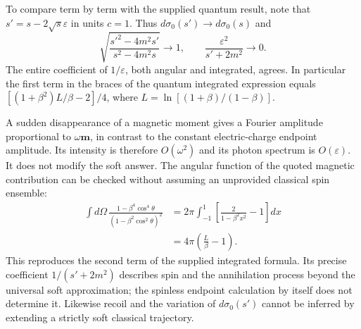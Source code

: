 To compare term by term with the supplied quantum result, note that
$s'=s-2\sqrt{s}\varepsilon$ in units $c=1$.  Thus
$d\sigma_0(s')\to d\sigma_0(s)$ and
\[
\sqrt{\frac{s'^2-4m^2s'}{s^2-4m^2s}}\longrightarrow1,
\qquad \frac{\varepsilon^2}{s'+2m^2}\longrightarrow0.
\]
The entire coefficient of $1/\varepsilon$, both angular and
integrated, agrees.  In particular the first term in the braces of
the quantum integrated expression equals
$[(1+\beta^2)L/\beta-2]/4$, where
$L=\ln[(1+\beta)/(1-\beta)]$.

A sudden disappearance of a magnetic moment gives a Fourier
amplitude proportional to $\omega\mathbf m$, in contrast to the
constant electric-charge endpoint amplitude.  Its intensity is
therefore $O(\omega^2)$ and its photon spectrum is $O(\varepsilon)$.
It does not modify the soft answer.  The angular function of the
quoted magnetic contribution can be checked without assuming an
unprovided classical spin ensemble:
\begin{align*}
\int d\Omega\,\frac{1-\beta^4\cos^4\theta}
 {(1-\beta^2\cos^2\theta)^2}
&=2\pi\int_{-1}^{1}\left[\frac2{1-\beta^2x^2}-1\right]dx\\
&=4\pi\left(\frac L\beta-1\right).
\end{align*}
This reproduces the second term of the supplied integrated formula.
Its precise coefficient $1/(s'+2m^2)$ describes spin and the
annihilation process beyond the universal soft approximation; the
spinless endpoint calculation by itself does not determine it.
Likewise recoil and the variation of $d\sigma_0(s')$ cannot be
inferred by extending a strictly soft classical trajectory.

